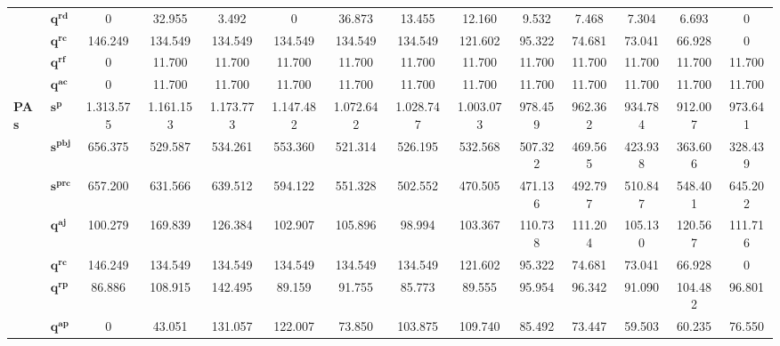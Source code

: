 \begin{table}
{\begin{tabular}{|l|l|c|c|c|c|c|c|c|c|c|c|c|c|}
& $\mathbf{q^{rd}}$ & 0 & 32.955 & 3.492 & 0 & 36.873 & 13.455 & 12.160 & 9.532 & 7.468 & 7.304 & 6.693 & 0 \\\cline{2-14}
& $\mathbf{q^{rc}}$ & 146.249 & 134.549 & 134.549 & 134.549 & 134.549 & 134.549 & 121.602 & 95.322 & 74.681 & 73.041 & 66.928 & 0 \\\cline{2-14}
& $\mathbf{q^{rf}}$ & 0 & 11.700 & 11.700 & 11.700 & 11.700 & 11.700 & 11.700 & 11.700 & 11.700 & 11.700 & 11.700 & 11.700 \\\cline{2-14}
& $\mathbf{q^{ac}}$ & 0 & 11.700 & 11.700 & 11.700 & 11.700 & 11.700 & 11.700 & 11.700 & 11.700 & 11.700 & 11.700 & 11.700 \\
\hline
\multirow{7}{*}{\textbf{PAs}} & $\mathbf{s^{p}}$ & 1.313.575 & 1.161.153 & 1.173.773 & 1.147.482 & 1.072.642 & 1.028.747 & 1.003.073 & 978.459 & 962.362 & 934.784 & 912.007 & 973.641 \\\cline{2-14}
& $\mathbf{s^{pbj}}$ & 656.375 & 529.587 & 534.261 & 553.360 & 521.314 & 526.195 & 532.568 & 507.322 & 469.565 & 423.938 & 363.606 & 328.439 \\\cline{2-14}
& $\mathbf{s^{prc}}$ & 657.200 & 631.566 & 639.512 & 594.122 & 551.328 & 502.552 & 470.505 & 471.136 & 492.797 & 510.847 & 548.401 & 645.202 \\\cline{2-14}
& $\mathbf{q^{aj}}$ & 100.279 & 169.839 & 126.384 & 102.907 & 105.896 & 98.994 & 103.367 & 110.738 & 111.204 & 105.130 & 120.567 & 111.716 \\\cline{2-14}
& $\mathbf{q^{rc}}$ & 146.249 & 134.549 & 134.549 & 134.549 & 134.549 & 134.549 & 121.602 & 95.322 & 74.681 & 73.041 & 66.928 & 0 \\\cline{2-14}
& $\mathbf{q^{rp}}$ & 86.886 & 108.915 & 142.495 & 89.159 & 91.755 & 85.773 & 89.555 & 95.954 & 96.342 & 91.090 & 104.482 & 96.801 \\\cline{2-14}
& $\mathbf{q^{ap}}$ & 0 & 43.051 & 131.057 & 122.007 & 73.850 & 103.875 & 109.740 & 85.492 & 73.447 & 59.503 & 60.235 & 76.550 \\ \cline{2-14}
\hline
\end{tabular}%
}
\fdadospesquisa
\end{table}

